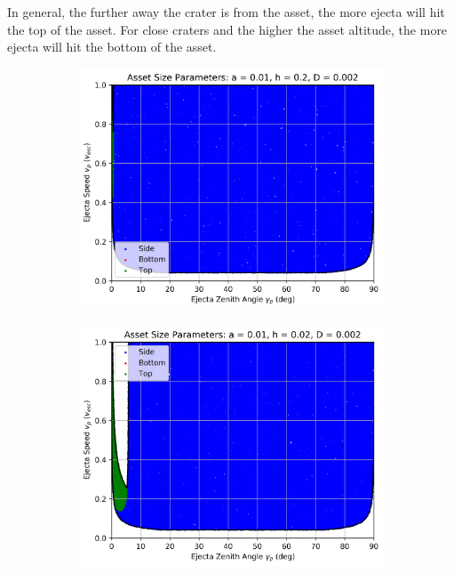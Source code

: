 \documentclass{article}
\begin{document}
In general, the further away the crater is from the asset, the more ejecta will hit the top of the asset. For close craters and the higher the asset altitude, the more ejecta will hit the bottom of the asset.

\begin{figure}
	\begin{subfigure}[t]{.32\textwidth}
		\centering
		\includegraphics[width=.95\linewidth]{asset_speed_zenith_plot_1.000e-02_2.000e-01_2.000e-03.png}  
		\label{fig:sub-asset_speed_zenith_1}
	\end{subfigure}
	\begin{subfigure}[t]{.32\textwidth}
		\centering
		\includegraphics[width=.95\linewidth]{asset_speed_zenith_plot_1.000e-02_2.000e-02_2.000e-03.png}  

\end{subfigure}
\end{figure}
\end{document}
